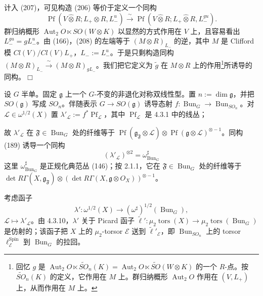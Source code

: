 计入 (207)，可见构造 (206) 等价于定义一个同构
\begin{equation}\tag{208}
\operatorname{Pf}(V\hat\otimes R;L_{+}\hat\otimes R,L^{u}_{-})\xrightarrow{\ \sim\ }\operatorname{Pf}(V\hat\otimes R;L_{+}\hat\otimes R,L^{gu}_{-}).
\end{equation}
群归纳概形 $\operatorname{Aut}_{2}O\ltimes SO(W\otimes K)$ 以显然的方式作用在 $V$ 上，且容易看出 $L^{gu}_{-}=gL^{u}_{-}$。由 (166)，(208) 的左端等于 $(M\otimes R)_{L_{-}}$ 的逆，其中 $M$ 是 Clifford 模 $Cl(V)/Cl(V)L_{+}$，$L_{-}:=L^{u}_{-}$。于是只剩构造同构 $(M\otimes R)_{L_{-}}\xrightarrow{\ \sim\ }(M\otimes R)_{gL_{-}}$。我们把它定义为 $\tilde{g}$ 在 $M\otimes R$ 上的作用\footnote{回忆 $g$ 是 $\operatorname{Aut}_{2}O\ltimes\tilde{SO}_{n}(K)=\operatorname{Aut}_{2}O\ltimes\tilde{SO}(W\otimes K)$ 的一个 $R$-点。按 $\tilde{SO}_{n}(K)$ 的定义，它作用在 $M$ 上。群归纳概形 $\operatorname{Aut}_{2}O$ 作用在 $(V,L_{+})$ 上，从而作用在 $M$ 上。}所诱导的同构。\hfill$\Box$


 设 $G$ 半单。固定 $\mathfrak{g}$ 上一个 $G$-不变的非退化对称双线性型。置 $n:=\dim\mathfrak{g}$，并把 $SO(\mathfrak{g})$ 写成 $SO_{n}$。伴随表示 $G\to SO(\mathfrak{g})$ 诱导态射 $f:\operatorname{Bun}_{G}\to\operatorname{Bun}_{SO_{n}}$。对 $\mathcal{L}\in\omega^{1/2}(X)$ 置 $\lambda'_{\mathcal{L}}:=f^{*}\operatorname{Pf}_{\mathcal{L}}$，其中 $\operatorname{Pf}_{\mathcal{L}}$ 是 4.3.1 中的线丛；


故 $\lambda'_{\mathcal{L}}$ 在 $\mathfrak{F}\in\operatorname{Bun}_{G}$ 处的纤维等于 $\operatorname{Pf}(\mathfrak{g}_{\mathfrak{F}}\otimes\mathcal{L})\otimes\operatorname{Pf}(\mathfrak{g}\otimes\mathcal{L})^{\otimes-1}$。同构 (189) 诱导一个同构
\begin{equation}\tag{209}
(\lambda'_{\mathcal{L}})^{\otimes 2}=\omega^{\sharp}_{\operatorname{Bun}_{G}}
\end{equation}
这里 $\omega^{\sharp}_{\operatorname{Bun}_{G}}$ 是正规化典范丛 (146)；按 2.1.1，它在 $\mathfrak{F}\in\operatorname{Bun}_{G}$ 处的纤维等于 $\det R\Gamma(X,\mathfrak{g}_{\mathfrak{F}})\otimes(\det R\Gamma(X,\mathfrak{g}\otimes O_{X}))^{\otimes-1}$。

 考虑函子
\begin{equation}\tag{210}
\lambda':\omega^{1/2}(X)\to(\omega^{\sharp})^{1/2}(\operatorname{Bun}_{G}),
\end{equation}
$\mathcal{L}\mapsto\lambda'_{\mathcal{L}}$。由 4.3.10，$\lambda'$ 关于 Picard 函子 $\tilde\ell':\mu_{2}\operatorname{tors}(X)\to\mu_{2}\operatorname{tors}(\operatorname{Bun}_{G})$ 是仿射的；该函子把 $X$ 上的 $\mu_{2}$-torsor $\mathcal{E}$ 送到 $\tilde\ell'_{\mathcal{E}}$，即 $\operatorname{Bun}_{SO_{n}}$ 上的 torsor $\ell^{\operatorname{Spin}}_{\mathcal{E}}$ 到 $\operatorname{Bun}_{G}$ 的拉回。

